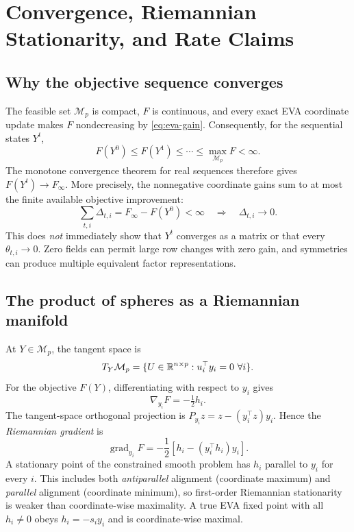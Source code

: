 \chapter{Convergence, Riemannian Stationarity, and Rate Claims}\label{ch:convergence}
\section{Why the objective sequence converges}
The feasible set $\mathcal M_p$ is compact, $F$ is continuous, and every exact EVA coordinate update makes $F$ nondecreasing by \eqref{eq:eva-gain}. Consequently, for the sequential states $Y^t$,
\[
F(Y^0)\le F(Y^1)\le\cdots\le \max_{\mathcal M_p}F<\infty.
\]
The monotone convergence theorem for real sequences therefore gives $F(Y^t)\to F_\infty$. More precisely, the nonnegative coordinate gains sum to at most the finite available objective improvement:
\begin{equation}\label{eq:gain-telescope}
\sum_{t,i}\Delta_{t,i}=F_\infty-F(Y^0)<\infty\quad\Longrightarrow\quad\Delta_{t,i}\to0.
\end{equation}
This does \emph{not} immediately show that $Y^t$ converges as a matrix or that every $\theta_{t,i}\to0$. Zero fields can permit large row changes with zero gain, and symmetries can produce multiple equivalent factor representations.

\section{The product of spheres as a Riemannian manifold}
At $Y\in\mathcal M_p$, the tangent space is
\[
T_Y\mathcal M_p=\{U\in\mathbb{R}^{n\times p}:u_i^\top y_i=0\ \forall i\}.
\]
For the objective $F(Y)$, differentiating with respect to $y_i$ gives
\[
\nabla_{y_i}F=-\tfrac12h_i.
\]
The tangent-space orthogonal projection is $P_{y_i}z=z-(y_i^\top z)y_i$. Hence the \emph{Riemannian gradient} is
\begin{equation}\label{eq:riemgrad}
\operatorname{grad}_{y_i}F=-\frac12\left[h_i-(y_i^\top h_i)y_i\right].
\end{equation}
A stationary point of the constrained smooth problem has $h_i$ parallel to $y_i$ for every $i$. This includes both \emph{antiparallel} alignment (coordinate maximum) and \emph{parallel} alignment (coordinate minimum), so first-order Riemannian stationarity is weaker than coordinate-wise maximality. A true EVA fixed point with all $h_i\ne0$ obeys $h_i=-s_iy_i$ and is coordinate-wise maximal.

